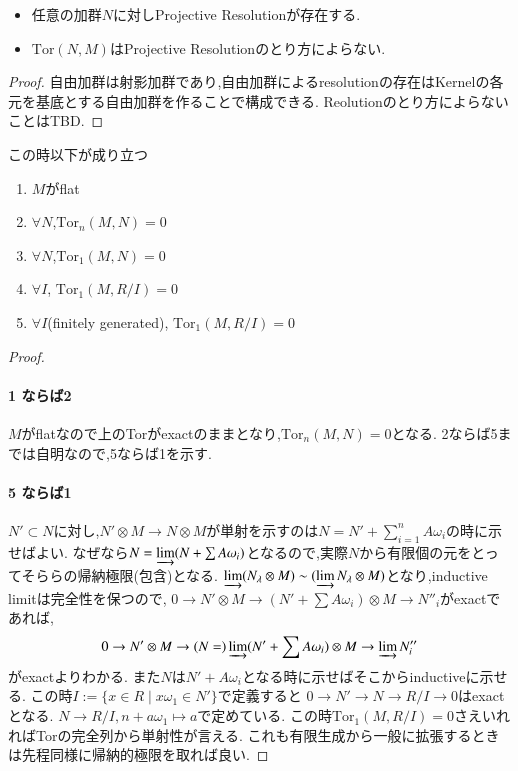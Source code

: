 \begin{lem}
\begin{itemize}
    \item 任意の加群$N$に対しProjective Resolutionが存在する.
    \item $\mathrm{Tor}(N, M)$はProjective Resolutionのとり方によらない.
\end{itemize}
\end{lem}
\begin{proof}
自由加群は射影加群であり,自由加群によるresolutionの存在はKernelの各元を基底とする自由加群を作ることで構成できる.
Reolutionのとり方によらないことはTBD.
\end{proof}

この時以下が成り立つ
\begin{prop}
 \begin{enumerate}
     \item $M$がflat
     \item $\forall N$,$\mathrm{Tor}_n(M, N) = 0$
     \item $\forall N$,$\mathrm{Tor}_1(M, N) = 0$
     \item $\forall I$, $\mathrm{Tor}_1(M, R/I) = 0$
     \item $\forall I$(finitely generated), $\mathrm{Tor}_1(M, R/I) = 0$
 \end{enumerate}
\end{prop}
\begin{proof}
\paragraph{1 ならば2}
$M$がflatなので上のTorがexactのままとなり,$\mathrm{Tor}_n(M, N) = 0$となる.
2ならば5までは自明なので,5ならば1を示す.

\paragraph{5 ならば1}
$N' \subset N$に対し,$N'\otimes M \to N \otimes M$が単射を示すのは$N = N' + \sum_{i=1}^n A \omega_i$の時に示せばよい.
なぜなら$N = \varinjlim (N + \sum A\omega_i)$となるので,実際$N$から有限個の元をとってそららの帰納極限(包含)となる.
$\varinjlim (N_{\lambda} \otimes M) \sim (\varinjlim N_{\lambda} \otimes M)$となり,inductive limitは完全性を保つので,
$0 \to N' \otimes M  \to (N' + \sum A \omega_i) \otimes M \to  N''_i$がexactであれば,
\begin{equation*}
0 \to N' \otimes M  \to (N =) \varinjlim(N' + \sum A \omega_i) \otimes M \to  \varinjlim N''_i
\end{equation*}
がexactよりわかる.
また$N$は$N' +A \omega_i$となる時に示せばそこからinductiveに示せる.
この時$I := \{ x \in R \mid x\omega_1 \in N' \}$で定義すると
$0 \to N' \to N \to R/I \to 0$はexactとなる.
$N \to R/I, n + a \omega_1 \mapsto a$で定めている.
この時$\mathrm{Tor}_1(M ,R/I) = 0$さえいれればTorの完全列から単射性が言える.
これも有限生成から一般に拡張するときは先程同様に帰納的極限を取れば良い.
\end{proof}


